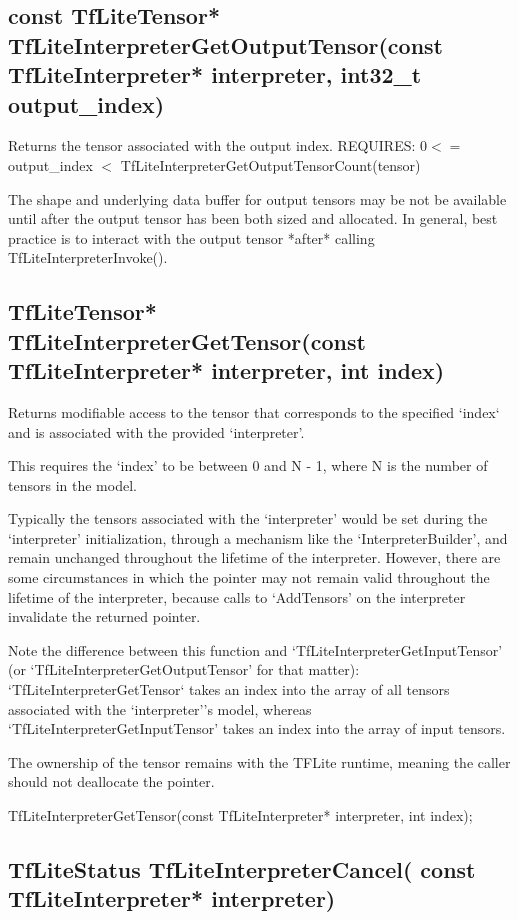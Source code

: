 \documentclass{ol-softwaremanual}
\begin{document}
\subsection{const TfLiteTensor* TfLiteInterpreterGetOutputTensor(const TfLiteInterpreter* interpreter, int32\_t output\_index)}

Returns the tensor associated with the output index.
REQUIRES: $0<=$ output\_index $<$ TfLiteInterpreterGetOutputTensorCount(tensor)

The shape and underlying data buffer for output tensors may be not be available until after the output tensor has been both sized and allocated. 
In general, best practice is to interact with the output tensor *after* calling TfLiteInterpreterInvoke().

\subsection{TfLiteTensor* TfLiteInterpreterGetTensor(const TfLiteInterpreter* interpreter, int index)}

Returns modifiable access to the tensor that corresponds to the specified `index` and is associated with the provided `interpreter'.

This requires the `index' to be between 0 and N - 1, where N is the number of tensors in the model.

Typically the tensors associated with the `interpreter' would be set during the `interpreter' initialization, through a mechanism like the `InterpreterBuilder', and remain unchanged throughout the lifetime of the interpreter.  However, there are some circumstances in which the pointer may  not remain valid throughout the lifetime of the interpreter, because calls  to `AddTensors' on the interpreter invalidate the returned pointer.

Note the difference between this function and `TfLiteInterpreterGetInputTensor' (or `TfLiteInterpreterGetOutputTensor' for that matter): `TfLiteInterpreterGetTensor` takes an index into the array of all tensors associated with the `interpreter''s model, whereas `TfLiteInterpreterGetInputTensor' takes an index into the array of input tensors.

The ownership of the tensor remains with the TFLite runtime, meaning the caller should not deallocate the pointer.

TfLiteInterpreterGetTensor(const TfLiteInterpreter* interpreter,
                                         int index);

\subsection{TfLiteStatus TfLiteInterpreterCancel( const TfLiteInterpreter* interpreter)}
\end{document}
